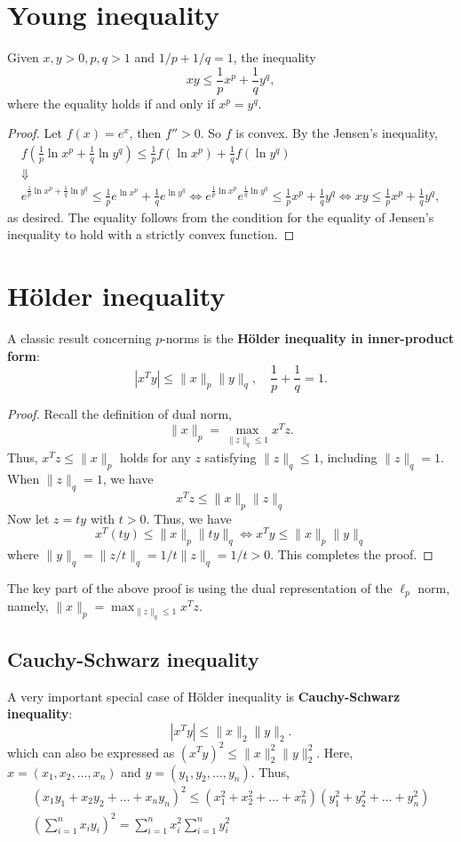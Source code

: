 \documentclass{article}
\theoremstyle{remark}
\begin{document}
\section{Young inequality}
Given $x,y>0, p,q>1$ and $1/p+1/q=1$, the inequality
\[
xy\le \frac{1}{p}x^p+\frac{1}{q}y^q,
\]
where the equality holds if and only if $x^p=y^q$.
\begin{proof}
Let $f(x)=e^x$, then $f''>0$. So $f$ is convex. By the Jensen's inequality,
\begin{gather*}
f(\frac{1}{p}\ln x^p+\frac{1}{q}\ln y^q)\le\frac{1}{p}f(\ln x^p)+\frac{1}{q}f(\ln y^q) \\
\Downarrow\\
e^{\frac{1}{p}\ln x^p+\frac{1}{q}\ln y^q}\le\frac{1}{p}e^{\ln x^p}+\frac{1}{q}e^{\ln y^q}
\Longleftrightarrow e^{\frac{1}{p}\ln x^p}e^{\frac{1}{q}\ln y^q}\le\frac{1}{p}x^p+\frac{1}{q}y^q 
\Longleftrightarrow xy\le\frac{1}{p}x^p+\frac{1}{q}y^q,
\end{gather*}
as desired. The equality follows from the condition for the equality of Jensen's inequality to hold with a strictly convex function. 
\end{proof}

\section{H\"{o}lder inequality}
A classic result concerning $p$-norms is the \textbf{\textcolor[rgb]{1.00,0.00,0.00}{H\"{o}lder inequality in inner-product form}}:
$$
|x^T y|\le \|x\|_p\|y\|_q,\quad \frac{1}{p}+\frac{1}{q}=1.
$$
\begin{proof}
Recall the definition of dual norm,
$$
\|x\|_p=\max_{\|z\|_q\le 1} x^Tz.
$$
Thus, $x^Tz\le \|x\|_p$ holds for any $z$ satisfying $\|z\|_q\le 1$, including $\|z\|_q= 1$. When $\|z\|_q= 1$, we have
$$x^Tz\le \|x\|_p\|z\|_q$$
Now let $z=ty$ with $t>0$. Thus, we have
\begin{equation*}
  x^T(ty)\le \|x\|_p\|ty\|_q \Longleftrightarrow x^Ty\le \|x\|_p\|y\|_q
\end{equation*}
where $\|y\|_q=\|z/t\|_q=1/t\|z\|_q=1/t>0$. This completes the proof.
\end{proof}
The key part of the above proof is using the dual representation of the $\ell_p$ norm, namely, $\|x\|_p=\max_{\|z\|_q\le 1} x^Tz$.

\subsection{Cauchy-Schwarz inequality}
A very important special case of H\"{o}lder inequality is \textcolor[rgb]{1.00,0.00,0.00}{\textbf{Cauchy-Schwarz inequality}}:
$$
|x^T y|\le \|x\|_2\|y\|_2.
$$
which can also be expressed as $(x^Ty)^2\le \|x\|_2^2\|y\|_2^2$. Here, $x=(x_1,x_2,\ldots,x_n)$ and $y=(y_1,y_2,\ldots,y_n)$. Thus,
\begin{gather*}
  (x_1y_1+x_2y_2+\ldots+x_ny_n)^2\le (x_1^2+x_2^2+\ldots+x_n^2)(y_1^2+y_2^2+\ldots+y_n^2) \\
  (\sum_{i=1}^{n}x_iy_i)^2=\sum_{i=1}^{n}x_i^2\sum_{i=1}^{n}y_i^2
\end{gather*}
\end{document}
